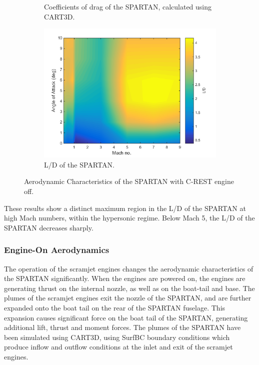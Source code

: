 \begin{figure}
\begin{subfigure}{.5\textwidth}
				\caption{Coefficients of drag of the SPARTAN, calculated using CART3D.}
				\label{fig:Cd}
			\end{subfigure}
			\begin{subfigure}{.5\textwidth}
				\centering
				\includegraphics[width=0.99\linewidth]{figures/3_vehicle_design/LD}
				\caption{L/D of the SPARTAN.}
				\label{fig:LD}
			\end{subfigure}
			\caption{Aerodynamic Characteristics of the SPARTAN with C-REST engine off.}
			\label{fig:aero1}
		\end{figure}
		
		These results show a distinct maximum region in the L/D of the SPARTAN at high Mach numbers, within the hypersonic regime. Below Mach 5, the L/D of the SPARTAN decreases sharply. 
		
		
		
		\subsubsection{Engine-On Aerodynamics}\label{sec:engine-on}
		
		The operation of the scramjet engines changes the aerodynamic characteristics of the SPARTAN significantly. When the engines are powered on, the engines are generating thrust on the internal nozzle, as well as on the boat-tail and base. 
		The plumes of the scramjet engines exit the nozzle of the SPARTAN, and are further expanded onto the boat tail on the rear of the SPARTAN fuselage. This expansion causes significant force on the boat tail of the SPARTAN, generating additional lift, thrust and moment forces. The plumes of the SPARTAN have been simulated using CART3D, using SurfBC boundary conditions which produce inflow and outflow conditions at the inlet and exit of the scramjet engines\cite{Pandya2004}. 
		
